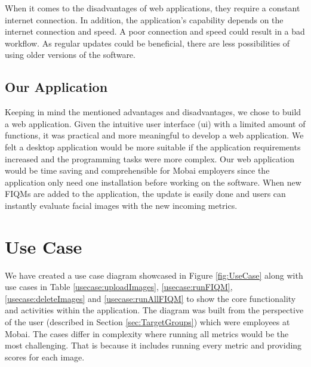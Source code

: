 When it comes to the disadvantages of web applications, they require a constant internet connection. In addition, the application's capability depends on the internet connection and speed. A poor connection and speed could result in a bad workflow. As regular updates could be beneficial, there are less possibilities of using older versions of the software. 
 
\subsection*{Our Application}
Keeping in mind the mentioned advantages and disadvantages, we chose to build a web application. Given the intuitive user interface (\acrshort{ui}) with a limited amount of functions, it was practical and more meaningful to develop a web application. We felt a desktop application would be more suitable if the application requirements increased and the programming tasks were more complex. Our web application would be time saving and comprehensible for Mobai employers since the application only need one installation before working on the software. When new FIQMs are added to the application, the update is easily done and users can instantly evaluate facial images with the new incoming metrics. 

\section{Use Case}
\label{sec:useCase}
We have created a use case diagram showcased in Figure \ref{fig:UseCase} along with use cases in Table \ref{usecase:uploadImages}, \ref{usecase:runFIQM}, \ref{usecase:deleteImages} and \ref{usecase:runAllFIQM} to show the core functionality and activities within the application. The diagram was built from the perspective of the user (described in Section \ref{sec:TargetGroups}) which were employees at Mobai. The cases differ in complexity where running all metrics would be the most challenging. That is because it includes running every metric and providing scores for each image. 

